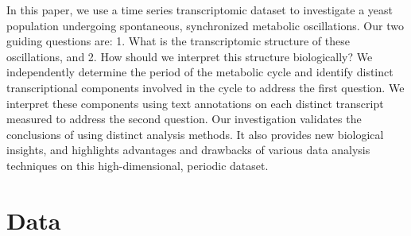 \documentclass[11pt]{amsart}
\begin{document}
In this paper, we use a time series transcriptomic dataset \cite{Tu2005} to investigate a yeast population undergoing spontaneous, synchronized metabolic oscillations. Our two guiding questions are: 1. What is the transcriptomic structure of these oscillations, and 2. How should we interpret this structure biologically? We independently determine the period of the metabolic cycle and identify distinct transcriptional components involved in the cycle to address the first question. We interpret these components using text annotations on each distinct transcript measured to address the second question. Our investigation validates the conclusions of \cite{Tu2005} using distinct analysis methods. It also provides new biological insights, and highlights advantages and drawbacks of various data analysis techniques on this high-dimensional, periodic dataset.

\section{Data} 

\end{document}
